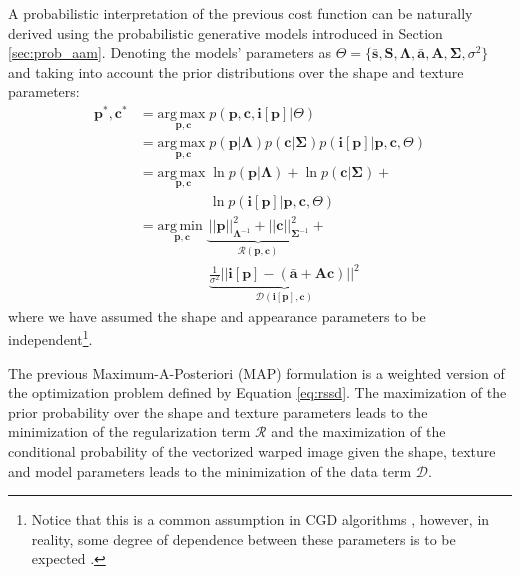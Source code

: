 A probabilistic interpretation of the previous cost function can be naturally derived using the probabilistic generative models introduced in Section \ref{sec:prob_aam}. Denoting the models' parameters as \mbox{$\Theta = \{\mathbf{\bar{s}}, \mathbf{S}, \mathbf{\Lambda}, \mathbf{\bar{a}}, \mathbf{A}, \mathbf{\Sigma}, \sigma^2\}$} and taking into account the prior distributions over the shape and texture parameters:
\begin{equation}
    \begin{aligned}
        \mathbf{p}^*, \mathbf{c}^* & = \underset{\mathbf{p}, \mathbf{c}}{\mathrm{arg\,max\;}} p(\mathbf{p}, \mathbf{c}, \mathbf{i}[\mathbf{p}] | \Theta) 
        \\
        & = \underset{\mathbf{p}, \mathbf{c}}{\mathrm{arg\,max\;}}  p(\mathbf{p} | \mathbf{\Lambda})  p(\mathbf{c} | \mathbf{\Sigma}) p(\mathbf{i}[\mathbf{p}] |
        \mathbf{p}, \mathbf{c}, \Theta)  
        \\
        & = \underset{\mathbf{p}, \mathbf{c}}{\mathrm{arg\,max\;}}  \ln p(\mathbf{p} | \mathbf{\Lambda}) + \ln p(\mathbf{c} | \mathbf{\Sigma}) +
        \\
        & \qquad \qquad \quad \ln p(\mathbf{i}[\mathbf{p}] | \mathbf{p}, \mathbf{c}, \Theta)
        \\
        & = \underset{\mathbf{p}, \mathbf{c}}{\mathrm{arg\,min\;}}  \underbrace{\frac{}{} ||\mathbf{p}||^2_{\mathbf{\Lambda}^{-1}} + ||\mathbf{c}||^2_{\mathbf{\Sigma}^{-1}}}_{\mathcal{R}(\mathbf{p}, \mathbf{c})} +
        \\
        & \qquad \qquad \quad \underbrace{ \frac{1}{\sigma^2} || \mathbf{i}[\mathbf{p}] - (\mathbf{\bar{a}} + \mathbf{A} \mathbf{c}) ||^2}_{\mathcal{D}(\mathbf{i}[\mathbf{p}], \mathbf{c})} 
    \end{aligned}
    \label{eq:prob_rssd}
\end{equation}
where we have assumed the shape and appearance parameters to be independent\footnote{Notice that this is a common assumption in CGD algorithms \cite{Matthews2004}, however, in reality, some degree of dependence between these parameters is to be expected \cite{Cootes2001}.}.

The previous Maximum-A-Posteriori (MAP) formulation is a weighted version of the optimization problem defined by Equation \ref{eq:rssd}. The maximization of the prior probability over the shape and texture parameters leads to the minimization of the regularization term $\mathcal{R}$ and the maximization of the conditional probability of the vectorized warped image given the shape, texture and model parameters leads to the minimization of the data term $\mathcal{D}$.

